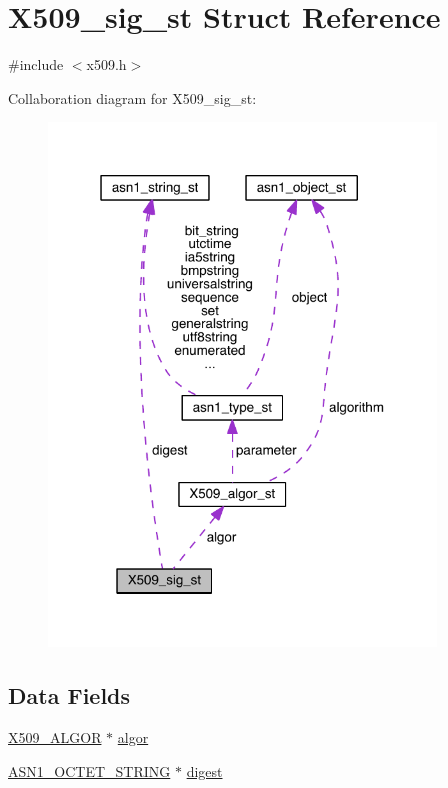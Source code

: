 \hypertarget{struct_x509__sig__st}{}\section{X509\+\_\+sig\+\_\+st Struct Reference}
\label{struct_x509__sig__st}


{\ttfamily \#include $<$x509.\+h$>$}



Collaboration diagram for X509\+\_\+sig\+\_\+st\+:\nopagebreak
\begin{figure}[H]
\begin{center}
\leavevmode
\includegraphics[width=292pt]{struct_x509__sig__st__coll__graph}
\end{center}
\end{figure}
\subsection*{Data Fields}
\begin{DoxyCompactItemize}
\item 
\hyperlink{crypto_2ossl__typ_8h_aa2b6185e6254f36f709cd6577fb5022e}{X509\+\_\+\+A\+L\+G\+OR} $\ast$ \hyperlink{struct_x509__sig__st_a22b96fe8b8a2f288e3672f438d25b232}{algor}
\item 
\hyperlink{crypto_2ossl__typ_8h_afbd05e94e0f0430a2b729473efec88c1}{A\+S\+N1\+\_\+\+O\+C\+T\+E\+T\+\_\+\+S\+T\+R\+I\+NG} $\ast$ \hyperlink{struct_x509__sig__st_ac51bfebf9ca26f5d9cb1f71701a25024}{digest}
\end{DoxyCompactItemize}


